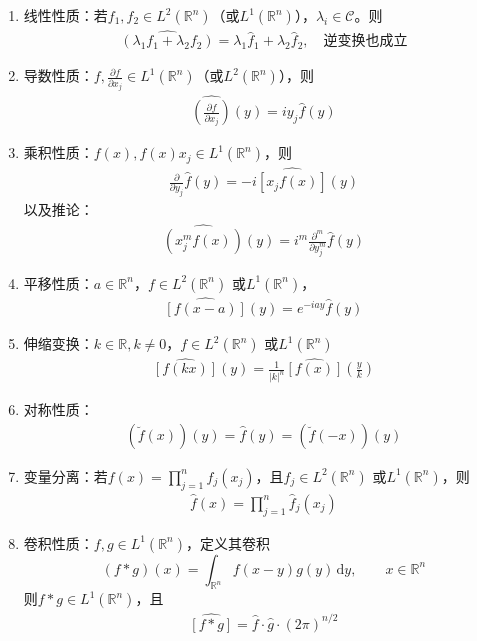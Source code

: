 \documentclass[11pt, a4paper]{article}
\theoremstyle{theorem}
\newcommand{\intd}[1]{\,\mathrm{d}{#1}}
\begin{document}
\begin{enumerate}[(1)]
  \item 线性性质：若$f_1, f_2 \in L^2(\mathbb{R}^n)$（或$L^1(\mathbb{R}^n)$），$\lambda_i \in \mathcal{C}$。则
  \begin{align}
  \widehat{(\lambda_1 f_1 + \lambda_2 f_2)} = \lambda_1 \hat{f}_1 + \lambda_2 \hat{f}_2, \quad \text{逆变换也成立}
  \end{align}
  \item 导数性质：$f, \frac{\partial f}{\partial x_j} \in L^1(\mathbb{R}^n)$（或$L^2(\mathbb{R}^n)$），则
  \begin{align}
      \widehat{\left(\frac{\partial f}{\partial x_j}\right)}(y) = i y_j \hat{f}(y)
  \end{align}
  \item 乘积性质：$f(x), f(x)x_j \in L^1(\mathbb{R}^n)$，则
  \begin{align}
      \frac{\partial }{\partial y_j} \hat{f}(y) = - i \widehat{\left[x_j f(x)\right]}(y)
  \end{align}
  以及推论：
  \begin{align}
      \widehat{(x_j^m f(x))}(y) = i^m \frac{\partial^m }{\partial y^m_j} \hat{f}(y)
  \end{align}
  \item 平移性质：$a \in \mathbb{R}^n$，$f \in L^2(\mathbb{R}^n)$ 或$L^1(\mathbb{R}^n)$，
  \begin{align}
      \widehat{\left[f(x-a)\right]}(y) = e^{-iay} \hat{f}(y)
  \end{align}
  \item 伸缩变换：$k \in \mathbb{R}, k \neq 0$，$f \in L^2(\mathbb{R}^n)$ 或$L^1(\mathbb{R}^n)$
  \begin{align}
    \widehat{\left[f(kx)\right]}(y) = \frac{1}{|k|^n} \widehat{[f(x)]}(\frac{y}{k})
  \end{align}
  \item 对称性质：
  \begin{align}
      (\breve{f}(x))(y) = \hat{f}(y) = (\breve{f}(-x))(y)
  \end{align}
  \item 变量分离：若$f(x) = \prod_{j=1}^n f_j(x_j)$，且$f_j \in L^2(\mathbb{R}^n)$ 或$L^1(\mathbb{R}^n)$，则
  \begin{align}
      \hat{f}(x) = \prod_{j=1}^n \hat{f}_j(x_j)
  \end{align}
  \item 卷积性质：$f,g \in L^1(\mathbb{R}^n)$，定义其卷积
  $$
  (f * g)(x) = \int_{\mathbb{R}^n} f(x - y) g(y) \intd y, \quad \quad x \in \mathbb{R}^n
  $$
  则$f * g \in L^1(\mathbb{R}^n)$，且
  \begin{align}
      \widehat{[f * g]} = \hat{f} \cdot \hat{g} \cdot (2\pi)^{n/2}
  \end{align}
\end{enumerate}
\end{document}
